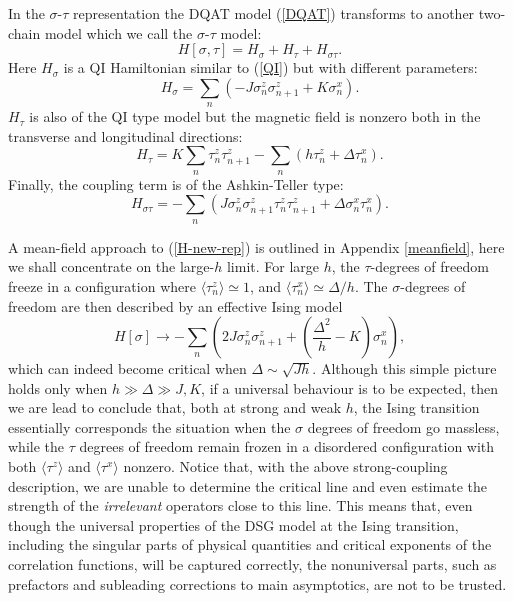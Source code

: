 In the $\sigma$-$\tau$ representation the DQAT model (\ref{DQAT}) transforms to
another two-chain model which we call the $\sigma$-$\tau$ model:
\begin{equation}
H[\sigma,\tau] = H_{\sigma} + H_{\tau} + H_{\sigma\tau}. \label{H-new-rep}
\end{equation}
Here $H_{\sigma}$ is a QI Hamiltonian similar to (\ref{QI}) but with different
parameters:
\begin{equation}
H_{\sigma} = \sum_n \left( - J \sigma^z _n \sigma^z _{n+1} + K \sigma^x _n \right).
\label{H-sigma'}
\end{equation}
$H_{\tau}$ is also of the QI type model but the magnetic field is nonzero
both in the transverse and longitudinal directions:
\begin{equation}
H_{\tau} = K \sum_n \tau^z _n \tau^z _{n+1}
- \sum_n \left( h \tau^z _n + \Delta \tau^x _n \right).
\label{H-tau'}
\end{equation}
Finally, the coupling term is of the Ashkin-Teller type:
\begin{equation}
H_{\sigma\tau} = - \sum_n \left( J \sigma^z _n \sigma^z _{n+1} \tau^z _n \tau^z _{n+1}
+ \Delta \sigma^x _n \tau^x _n \right).
\label{H-sigma-tau'}
\end{equation}

A mean-field approach to (\ref{H-new-rep}) is outlined
in Appendix \ref{meanfield}, here we shall concentrate
on the large-$h$ limit.
For large $h$, the $\tau$-degrees of freedom freeze in a
configuration where $\langle \tau^z_n\rangle \simeq 1$, and
$\langle \tau^x_n\rangle \simeq \Delta/h$. The
$\sigma$-degrees of freedom are then described by an effective
Ising model
\begin{equation}
H[\sigma] \rightarrow - \sum_n \left( 2 J \sigma^z _n \sigma^z _{n+1}
+ \left(\frac{\Delta^2}{h}-K\right) \sigma^x _n \right),
\label{Hseffect}
\end{equation}
which
can indeed become critical when $\Delta \sim \sqrt{Jh}$. Although
this simple picture holds only when $h\gg \Delta \gg J,K$,
if a universal behaviour is to be expected, then we are lead to conclude
that, both at strong and weak $h$, the Ising transition essentially
corresponds the situation when the $\sigma$ degrees of freedom go massless,
while the $\tau$ degrees of freedom remain frozen in a disordered
configuration with both $\langle \tau^z \rangle$ and $\langle \tau^x \rangle$
nonzero.
Notice that, with the above strong-coupling description,
we are unable to determine
the critical line and even estimate the
strength of the {\sl irrelevant} operators close to this line.
This means that, even though the universal properties of the DSG model
at the Ising transition, including the singular
parts of physical quantities and critical exponents of the correlation
functions, will be captured correctly, the nonuniversal parts, such as
prefactors and subleading corrections to main asymptotics,
are not to be trusted.

